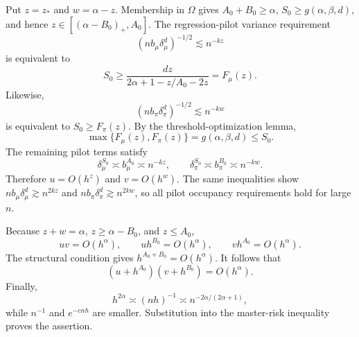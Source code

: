 Put \(z=z_*\) and \(w=\alpha-z\). Membership in \(\Omega\) gives \(A_0+B_0\ge\alpha\), \(S_0\ge g(\alpha,\beta,d)\), and hence \(z\in[(\alpha-B_0)_+,A_0]\). The regression-pilot variance requirement
\[
(nb_\mu\delta_\mu^d)^{-1/2}\lesssim n^{-kz}
\]
is equivalent to
\[
S_0\ge \frac{dz}{2\alpha+1-z/A_0-2z}=F_\mu(z).
\]
Likewise,
\[
(nb_\pi\delta_\pi^d)^{-1/2}\lesssim n^{-kw}
\]
is equivalent to \(S_0\ge F_\pi(z)\). By the threshold-optimization lemma,
\[
\max\{F_\mu(z),F_\pi(z)\}=g(\alpha,\beta,d)\le S_0.
\]
The remaining pilot terms satisfy
\[
\delta_\mu^{S_0}\asymp b_\mu^{A_0}\asymp n^{-kz},
\qquad
\delta_\pi^{S_0}\asymp b_\pi^{B_0}\asymp n^{-kw}.
\]
Therefore \(u=O(h^z)\) and \(v=O(h^w)\). The same inequalities show \(nb_\mu\delta_\mu^d\gtrsim n^{2kz}\) and \(nb_\pi\delta_\pi^d\gtrsim n^{2kw}\), so all pilot occupancy requirements hold for large \(n\).

Because \(z+w=\alpha\), \(z\ge\alpha-B_0\), and \(z\le A_0\),
\[
uv=O(h^\alpha),
\qquad
uh^{B_0}=O(h^\alpha),
\qquad
vh^{A_0}=O(h^\alpha).
\]
The structural condition gives \(h^{A_0+B_0}=O(h^\alpha)\). It follows that
\[
(u+h^{A_0})(v+h^{B_0})=O(h^\alpha).
\]
Finally,
\[
h^{2\alpha}\asymp (nh)^{-1}\asymp n^{-2\alpha/(2\alpha+1)},
\]
while \(n^{-1}\) and \(e^{-cnh}\) are smaller. Substitution into the master-risk inequality proves the assertion.